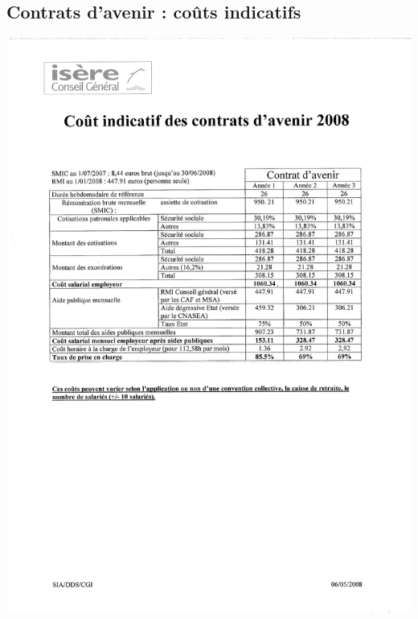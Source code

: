 \subsection{Contrats d'avenir : coûts indicatifs}
\begin{center}
\includegraphics[scale=0.7]{annexes/images/contrats_avenir_indicatif.pdf}
\end{center}
